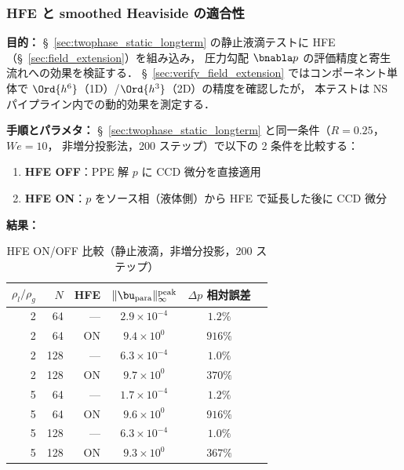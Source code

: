 \subsubsection{HFE と smoothed Heaviside の適合性}
\label{sec:hfe_smoothed_heaviside}

\noindent\textbf{目的：}
§~\ref{sec:twophase_static_longterm} の静止液滴テストに
HFE（§~\ref{sec:field_extension}）を組み込み，
圧力勾配 $\bnabla p$ の評価精度と寄生流れへの効果を検証する．
§~\ref{sec:verify_field_extension} ではコンポーネント単体で
$\Ord{h^6}$（1D）/$\Ord{h^3}$（2D）の精度を確認したが，
本テストは NS パイプライン内での動的効果を測定する．

\noindent\textbf{手順とパラメタ：}
§~\ref{sec:twophase_static_longterm} と同一条件（$R=0.25$，$\mathit{We} = 10$，
非増分投影法，200 ステップ）で以下の 2 条件を比較する：
\begin{enumerate}[noitemsep]
  \item \textbf{HFE OFF}：PPE 解 $p$ に CCD 微分を直接適用
  \item \textbf{HFE ON}：$p$ をソース相（液体側）から HFE で延長した後に CCD 微分
\end{enumerate}

\noindent\textbf{結果：}

\begin{table}[htbp]
\centering
\caption{HFE ON/OFF 比較（静止液滴，非増分投影，200 ステップ）}
\label{tab:hfe_ns_effect}
\renewcommand{\arraystretch}{1.3}
\begin{tabular}{rrrccc}
\toprule
$\rho_l/\rho_g$ & $N$ & HFE &
$\|\bu_{\mathrm{para}}\|_\infty^{\mathrm{peak}}$ &
$\Delta p$ 相対誤差 \\
\midrule
2 & 64  & ---  & $2.9 \times 10^{-4}$ & $1.2\%$ \\
2 & 64  & ON   & $9.4 \times 10^{0}$  & $916\%$ \\
2 & 128 & ---  & $6.3 \times 10^{-4}$ & $1.0\%$ \\
2 & 128 & ON   & $9.7 \times 10^{0}$  & $370\%$ \\
\midrule
5 & 64  & ---  & $1.7 \times 10^{-4}$ & $1.2\%$ \\
5 & 64  & ON   & $9.6 \times 10^{0}$  & $916\%$ \\
5 & 128 & ---  & $6.3 \times 10^{-4}$ & $1.0\%$ \\
5 & 128 & ON   & $9.3 \times 10^{0}$  & $367\%$ \\
\bottomrule
\end{tabular}
\end{table}

